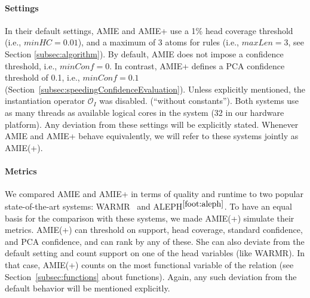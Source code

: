 \paragraph{Settings}
In their default settings, AMIE and AMIE+ use a 1\% head coverage threshold (i.e., $minHC=0.01$), and a maximum of 3 atoms for rules (i.e., $maxLen=3$, see Section \ref{subsec:algorithm}).
By default, AMIE does not impose a confidence threshold, i.e., $minConf=0$.
In contrast, AMIE+ defines a PCA confidence threshold of 0.1, i.e., $minConf=0.1$ (Section~\ref{subsec:speedingConfidenceEvaluation}).
Unless explicitly mentioned, the instantiation operator $\mathcal{O}_I$ was disabled. (``without constants'').
Both systems use as many threads as available logical cores in the system (32 in our hardware platform).
Any deviation from these settings will be explicitly stated. Whenever AMIE and AMIE+ behave equivalently, we will refer to these systems jointly as AMIE(+).


\paragraph{Metrics}
We compared AMIE and AMIE+ in terms of quality and runtime to two popular state-of-the-art systems:
WARMR~\cite{DehToi99,DehToi00} and ALEPH$^{\ref{foot:aleph}}$.
To have an equal basis for the comparison with these systems, we made AMIE(+)
simulate their metrics.
AMIE(+) can threshold on support, head coverage, standard confidence, and PCA confidence, and can rank by any of these.
She can also deviate from the default setting and count support on one of the head variables (like WARMR).
In that case, AMIE(+) counts on the most functional variable of the relation (see Section~\ref{subsec:functions} about functions).
Again, any such deviation from the default behavior will be mentioned explicitly.


